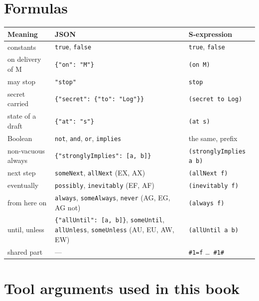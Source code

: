 \section{Formulas}

\begin{center}
\begin{tabular}{@{}>{\raggedright\arraybackslash}p{}>{\raggedright\arraybackslash}p{}>{\raggedright\arraybackslash}p{}@{}}
\toprule
Meaning & JSON & S-expression \\
\midrule
constants & \texttt{true}, \texttt{false} & \texttt{true}, \texttt{false} \\
on delivery of M & \texttt{\{"on": "M"\}} & \texttt{(on M)} \\
may stop & \texttt{"stop"} & \texttt{stop} \\
secret carried & \texttt{\{"secret": \{"to": "Log"\}\}} & \texttt{(secret to Log)} \\
state of a draft & \texttt{\{"at": "s"\}} & \texttt{(at s)} \\
Boolean & \texttt{not}, \texttt{and}, \texttt{or}, \texttt{implies} & the same, prefix \\
non-vacuous always & \texttt{\{"stronglyImplies": [a, b]\}} & \texttt{(stronglyImplies a b)} \\
next step & \texttt{someNext}, \texttt{allNext} (EX, AX) & \texttt{(allNext f)} \\
eventually & \texttt{possibly}, \texttt{inevitably} (EF, AF) & \texttt{(inevitably f)} \\
from here on & \texttt{always}, \texttt{someAlways}, \texttt{never} (AG, EG, AG not) & \texttt{(always f)} \\
until, unless & \texttt{\{"allUntil": [a, b]\}}, \texttt{someUntil}, \texttt{allUnless}, \texttt{someUnless} (AU, EU, AW, EW) & \texttt{(allUntil a b)} \\
shared part & --- & \texttt{\#1=f} \ldots\ \texttt{\#1\#} \\
\bottomrule
\end{tabular}
\end{center}

\section{Tool arguments used in this book}

